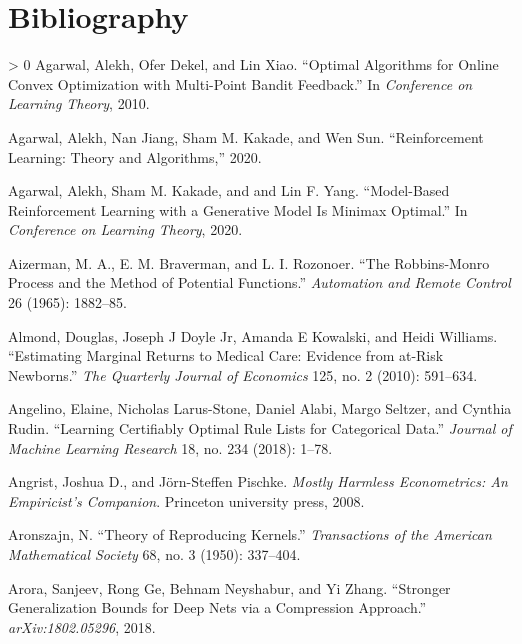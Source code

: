 \documentclass{tufte-book}
\newlength{\cslhangindent}
\newenvironment{CSLReferences}[3] %
 {%
  \setlength{\parindent}{0pt}
  \ifodd #1 \everypar{\setlength{\hangindent}{\cslhangindent}}\ignorespaces\fi
  \ifnum #2 > 0
  \setlength{\parskip}{#3\baselineskip}
  \fi
 }%
 {
 }
\newif\ifshowchapternumber
\begin{document}
\showchapternumberfalse

\chapter{Bibliography}

\parindent=0pt

\hypertarget{refs}{}
\begin{CSLReferences}{1}{0}
\leavevmode\hypertarget{ref-agarwal2010optimal}{}%
Agarwal, Alekh, Ofer Dekel, and Lin Xiao. {``Optimal Algorithms for
Online Convex Optimization with Multi-Point Bandit Feedback.''} In
\emph{Conference on Learning Theory}, 2010.

\leavevmode\hypertarget{ref-RLTheoryBook}{}%
Agarwal, Alekh, Nan Jiang, Sham M. Kakade, and Wen Sun. {``Reinforcement
Learning: Theory and Algorithms,''} 2020.

\leavevmode\hypertarget{ref-Agarwal2020c}{}%
Agarwal, Alekh, Sham M. Kakade, and and Lin F. Yang. {``Model-Based
Reinforcement Learning with a Generative Model Is Minimax Optimal.''} In
\emph{Conference on Learning Theory}, 2020.

\leavevmode\hypertarget{ref-Aizerman65}{}%
Aizerman, M. A., E. M. Braverman, and L. I. Rozonoer. {``The
Robbins-Monro Process and the Method of Potential Functions.''}
\emph{Automation and Remote Control} 26 (1965): 1882--85.

\leavevmode\hypertarget{ref-almond2010estimating}{}%
Almond, Douglas, Joseph J Doyle Jr, Amanda E Kowalski, and Heidi
Williams. {``Estimating Marginal Returns to Medical Care: Evidence from
at-Risk Newborns.''} \emph{The Quarterly Journal of Economics} 125, no.
2 (2010): 591--634.

\leavevmode\hypertarget{ref-Angelino2017}{}%
Angelino, Elaine, Nicholas Larus-Stone, Daniel Alabi, Margo Seltzer, and
Cynthia Rudin. {``Learning Certifiably Optimal Rule Lists for
Categorical Data.''} \emph{Journal of Machine Learning Research} 18, no.
234 (2018): 1--78.

\leavevmode\hypertarget{ref-angrist2008mostly}{}%
Angrist, Joshua D., and Jörn-Steffen Pischke. \emph{Mostly Harmless
Econometrics: An Empiricist's Companion}. Princeton university press,
2008.

\leavevmode\hypertarget{ref-Aronszajn50}{}%
Aronszajn, N. {``Theory of Reproducing Kernels.''} \emph{Transactions of
the American Mathematical Society} 68, no. 3 (1950): 337--404.

\leavevmode\hypertarget{ref-arora2018stronger}{}%
Arora, Sanjeev, Rong Ge, Behnam Neyshabur, and Yi Zhang. {``Stronger
Generalization Bounds for Deep Nets via a Compression Approach.''}
\emph{arXiv:1802.05296}, 2018.


\end{CSLReferences}
\end{document}
